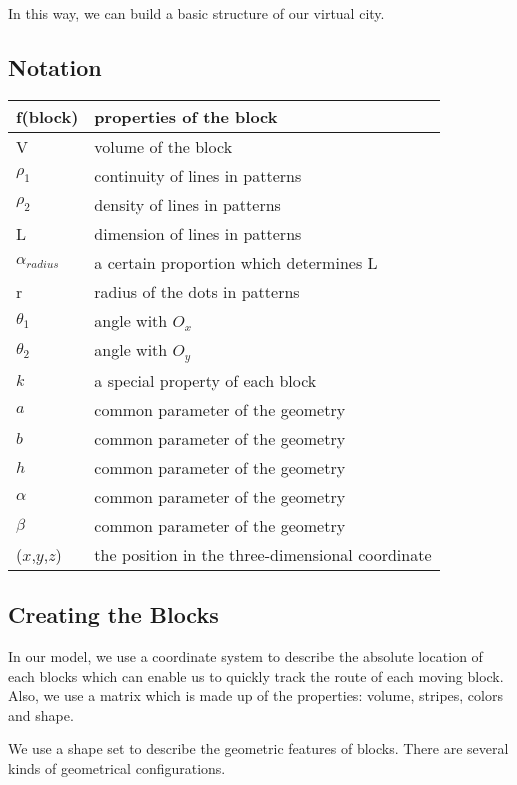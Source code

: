\documentclass[12pt]{article}
\theoremstyle{definition}
\theoremstyle{remark}
\numberwithin{equation}{section}
\begin{document}
		In this way, we can build a basic structure of our virtual city.
		
	\subsection{Notation}
		\begin{tabular}{|l|l|}
			\hline
			f(block)&properties of the block\\
			\hline
			V&volume of the block\\
			\hline
			$\rho_{1}$&continuity of lines in patterns\\
			\hline
			$\rho_{2}$&density of lines in patterns\\
			\hline
			L&dimension of lines in patterns\\
			\hline
			$\alpha_{radius}$&a certain proportion which determines L\\
			\hline
			r&radius of the dots in patterns\\
			\hline
			$\theta_{1}$&angle with $O_{x}$\\
			\hline
			$\theta_{2}$&angle with $O_{y}$\\
			\hline		
			$k$&a special property of each block\\
			\hline
			$a$&common parameter of the geometry\\
			\hline
			$b$&common parameter of the geometry\\
			\hline
			$h$&common parameter of the geometry\\
			\hline
			$\alpha$&common parameter of the geometry\\
			\hline
			$\beta$&common parameter of the geometry\\
			\hline
			($x$,$y$,$z$)&the position in the three-dimensional coordinate\\
			\hline
		\end{tabular}
	
	\subsection{Creating the Blocks}
      In our model, we use a coordinate system to describe the absolute location of each blocks which can enable us to quickly track the route of each moving block. Also, we use a matrix which is made up of the properties: volume, stripes, colors and shape.
	  
	  We use a shape set to describe the geometric features of blocks. There are several kinds of geometrical configurations.
	  
\end{document}

